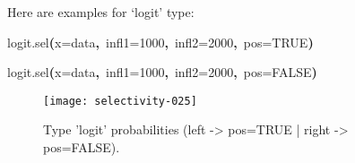 \documentclass[letterpaper, 12pt]{article}
\newenvironment{Hinput}%
{}%
{}%
\newenvironment{Hchunk}%
{\vspace{0.5em}\par\begin{flushleft}}%
{\end{flushleft}}%
\newcommand{\hlnumber}[1]{\textcolor[rgb]{0.0823529411764706,0.0784313725490196,0.709803921568627}{#1}}%
\newcommand{\hlfunctioncall}[1]{\textcolor[rgb]{1,0,0}{#1}}%
\newcommand{\hlkeyword}[1]{\textcolor[rgb]{0,0,0}{\textbf{#1}}}%
\newcommand{\hlargument}[1]{\textcolor[rgb]{0.694117647058824,0.247058823529412,0.0196078431372549}{#1}}%
\newcommand{\hlsymbol}[1]{\textcolor[rgb]{0,0,0}{#1}}%
\newcommand{\hlprompt}[1]{\textcolor[rgb]{0,0,0}{#1}}%
\begin{document}
Here are examples for `logit' type:
\begin{Hchunk}
\begin{normalsize}
\begin{Hinput}
\ttfamily\noindent
\hlprompt{\usebox{\hlnormalsizeboxgreaterthan}{\ }}\hlfunctioncall{logit.sel}\hlkeyword{(}\hlargument{x}\hlargument{=}\hlsymbol{data}\hlkeyword{,}{\ }\hlargument{infl1}\hlargument{=}\hlnumber{1000}\hlkeyword{,}{\ }\hlargument{infl2}\hlargument{=}\hlnumber{2000}\hlkeyword{,}{\ }\hlargument{pos}\hlargument{=}\hlnumber{TRUE}\hlkeyword{)}\mbox{}
\normalfont
\end{Hinput}


\begin{Hinput}
\ttfamily\noindent
\hlprompt{\usebox{\hlnormalsizeboxgreaterthan}{\ }}\hlfunctioncall{logit.sel}\hlkeyword{(}\hlargument{x}\hlargument{=}\hlsymbol{data}\hlkeyword{,}{\ }\hlargument{infl1}\hlargument{=}\hlnumber{1000}\hlkeyword{,}{\ }\hlargument{infl2}\hlargument{=}\hlnumber{2000}\hlkeyword{,}{\ }\hlargument{pos}\hlargument{=}\hlnumber{FALSE}\hlkeyword{)}\mbox{}
\normalfont
\end{Hinput}


\end{normalsize}
\end{Hchunk}

\begin{figure}[h]
\vspace{-20pt}
\begin{center}
\texttt{[image: selectivity-025]}
\end{center}
\vspace{-30pt}
\caption{Type 'logit' probabilities (left -> pos=TRUE |  right -> pos=FALSE).}
\vspace{-10pt}
\label{fig12}
\end{figure}

\vspace*{\fill}
\newpage
\end{document}
